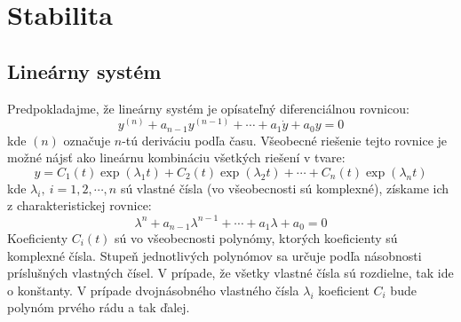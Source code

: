 \documentclass[a4paper, 10pt, ]{article}
\begin{document}
\bigskip

\normalsize
\normalfont



\section{Stabilita}


\subsection{Lineárny systém}
\label{Stability.LinearSystem}

Predpokladajme, že lineárny systém je opísateľný diferenciálnou rovnicou:
\begin{equation}
    y^{(n)} + a_{n - 1} y^{(n - 1)} + \cdots + a_{1} \dot{y} + a_{0} y = 0    
\end{equation}
kde $(n)$ označuje $n$-tú deriváciu podľa času. Všeobecné riešenie tejto rovnice je možné nájsť ako lineárnu kombináciu všetkých riešení v tvare:
\begin{equation}
    \label{Stability.LinearSystem.Equation:LDESolution}
    y = 
    C_{1}(t) \exp(\lambda_{1} t) + C_{2}(t) \exp(\lambda_{2} t) + \cdots + C_{n}(t) \exp(\lambda_{n} t)
\end{equation}
kde $\lambda_{i}, \ i = 1, 2, \cdots, n$ sú vlastné čísla (vo všeobecnosti sú komplexné), získame ich z charakteristickej rovnice:
\begin{equation}
    \lambda^{n} + a_{n - 1} \lambda^{n - 1} + \cdots + a_{1} \lambda + a_{0} = 0    
\end{equation} 
Koeficienty $C_i(t)$ sú vo všeobecnosti polynómy, ktorých koeficienty sú komplexné čísla. Stupeň jednotlivých polynómov sa určuje podľa násobnosti príslušných vlastných čísel. V prípade, že všetky vlastné čísla sú rozdielne, tak ide o konštanty. V prípade dvojnásobného vlastného čísla $\lambda_{i}$ koeficient $C_{i}$ bude polynóm prvého rádu a tak ďalej.
\end{document}

